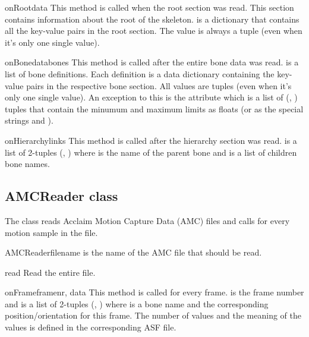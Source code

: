 \begin{methoddesc}{onRoot}{data}
This method is called when the root section was read. This section contains
information about the root of the skeleton.  is a dictionary
that contains all the key-value pairs in the root section. The value
is always a tuple (even when it's only one single value). 
\end{methoddesc}

\begin{methoddesc}{onBonedata}{bones}
This method is called after the entire bone data was read. 
is a list of bone definitions. Each definition is a data dictionary
containing the key-value pairs in the respective bone section. All values
are tuples (even when it's only one single value). An exception to this
is the  attribute which is a list of (, )
tuples that contain the minumum and maximum limits as floats (or as the
special strings  and ).
\end{methoddesc}

\begin{methoddesc}{onHierarchy}{links}
This method is called after the hierarchy section was read. 
is a list of 2-tuples (, ) where 
is the name of the parent bone and  is a list of children
bone names.
\end{methoddesc}

\subsection{AMCReader class}

The  class reads Acclaim Motion Capture Data (AMC) files
and calls  for every motion sample in the file.

\begin{classdesc}{AMCReader}{filename}
   is the name of the AMC file that should be read.
\end{classdesc}

\begin{methoddesc}{read}{}
Read the entire file.
\end{methoddesc}

\begin{methoddesc}{onFrame}{framenr, data}
This method is called for every frame.  is the frame number 
and  is a list of 2-tuples (, ) where
 is a bone name and  the corresponding 
position/orientation for this frame. The number of values and the
meaning of the values is defined in the corresponding ASF file.
\end{methoddesc}

